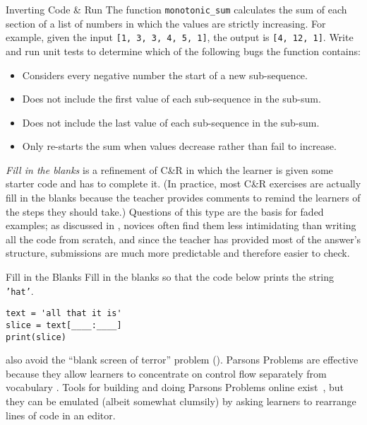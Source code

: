 \begin{aside}{Inverting Code \& Run}
  The function \texttt{monotonic\_sum} calculates the sum of each section
  of a list of numbers in which the values are strictly increasing.
  For example,
  given the input \texttt{[1,\ 3,\ 3,\ 4,\ 5,\ 1]},
  the output is \texttt{[4,\ 12,\ 1]}.
  Write and run unit tests to determine which of the following bugs the function contains:

  \begin{itemize}
  \item
    Considers every negative number the start of a new sub-sequence.
  \item
    Does not include the first value of each sub-sequence in the sub-sum.
  \item
    Does not include the last value of each sub-sequence in the sub-sum.
  \item
    Only re-starts the sum when values decrease rather than fail to increase.
  \end{itemize}
\end{aside}

\emph{Fill in the blanks} is a refinement of C\&R
in which the learner is given some starter code and has to complete it.
(In practice, most C\&R exercises are actually fill in the blanks
because the teacher provides comments
to remind the learners of the steps they should take.)
Questions of this type are the basis for faded examples;
as discussed in ,
novices often find them less intimidating than writing all the code from scratch,
and since the teacher has provided most of the answer's structure,
submissions are much more predictable and therefore easier to check.

\begin{aside}{Fill in the Blanks}
  Fill in the blanks
  so that the code below prints the string \texttt{'hat'}.

\begin{verbatim}
text = 'all that it is'
slice = text[____:____]
print(slice)
\end{verbatim}
\end{aside}

 also avoid
the ``blank screen of terror'' problem ().
Parsons Problems are effective because
they allow learners to concentrate on control flow separately from vocabulary
\cite{Pars2006,Eric2015,Morr2016,Eric2017}.
Tools for building and doing Parsons Problems online exist~\cite{Ihan2011},
but they can be emulated (albeit somewhat clumsily)
by asking learners to rearrange lines of code in an editor.


